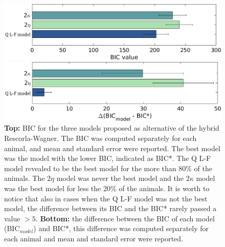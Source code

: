 \begin{figure}
    \centering
    \includegraphics[scale=0.48]{figures/BIC_Value.png}
    
    \vspace{1cm}
    
    \includegraphics[scale=0.48]{figures/DeltaBIC.png}
    \caption{\textbf{Top:} BIC for the three models proposed as alternative of the hybrid Rescorla-Wagner. The BIC was computed separately for each animal, and mean and standard error were reported. The best model was the model with the lower BIC, indicated as BIC*. The Q L-F model revealed to be the best model for the more than 80$\%$ of the animals. The $2\eta$ model was never the best model and the $2\kappa$ model was the best model for less the 20$\%$ of the animals. It is worth to notice that also in cases when the Q L-F model was not the best model, the difference between its BIC and the BIC* rarely passed a value $>5$. \textbf{Bottom:} the difference between the BIC of each model (BIC$_{model}$) and BIC*, this difference was computed separately for each animal and mean and standard error were reported.}
    \label{fig:BIC}
\end{figure}

